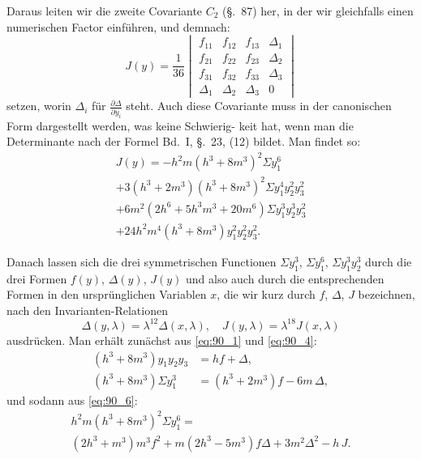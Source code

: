 \documentclass[12pt,a4paper]{article}
\theoremstyle{plain}
\theoremstyle{definition}
\theoremstyle{remark}
\begin{document}
Daraus leiten wir die zweite Covariante $C_2$ (\S.~87) her, in
der wir gleichfalls einen numerischen Factor einführen, und
demnach:
\begin{equation}\label{eq:90_5}
J(y) = \frac{1}{36}\begin{vmatrix}
f_{11} & f_{12} & f_{13} & \Delta_1 \\
f_{21} & f_{22} & f_{23} & \Delta_2 \\
f_{31} & f_{32} & f_{33} & \Delta_3 \\
\Delta_1 & \Delta_2 & \Delta_3 & 0
\end{vmatrix}
\end{equation}
setzen, worin $\Delta_i$ für $\frac{\partial \Delta}{\partial y_i}$ steht. Auch diese Covariante muss
in der canonischen Form dargestellt werden, was keine Schwierig-
keit hat, wenn man die Determinante nach der Formel Bd.~I,
\S.~23, (12) bildet. Man findet so:
\begin{multline}\label{eq:90_6}
J(y) = -h^2 m (h^3 + 8m^3)^2 \Sigma y_1^6 \\
+ 3(h^3 + 2m^3)(h^3 + 8m^3)^2 \Sigma y_1^4 y_2^2 y_3^2 \\
+ 6m^2 (2h^6 + 5h^3 m^3 + 20m^6) \Sigma y_1^3 y_2^3 y_3^2 \\
+ 24h^2 m^4 (h^3 + 8m^3) y_1^2 y_2^2 y_3^2.
\end{multline}

Danach lassen sich die drei symmetrischen Functionen
$\Sigma y_1^3$, $\Sigma y_1^6$, $\Sigma y_1^3 y_2^3$ durch die drei Formen $f(y)$, $\Delta(y)$, $J(y)$
und also auch durch die entsprechenden Formen in den
ursprünglichen Variablen $x$, die wir kurz durch $f$, $\Delta$, $J$ bezeichnen,
nach den Invarianten-Relationen
\begin{equation}\label{eq:90_inv}
\Delta(y, \lambda) = \lambda^{12} \Delta(x, \lambda), \quad J(y, \lambda) = \lambda^{18} J(x, \lambda)
\end{equation}
ausdrücken. Man erhält zunächst aus \eqref{eq:90_1} und \eqref{eq:90_4}:
\begin{align}
(h^3 + 8m^3) y_1 y_2 y_3 &= hf + \Delta, \label{eq:90_7} \\
(h^3 + 8m^3) \Sigma y_1^3 &= (h^3 + 2m^3) f - 6m\, \Delta, \label{eq:90_8}
\end{align}
und sodann aus \eqref{eq:90_6}:
\begin{multline}\label{eq:90_9}
h^2 m (h^3 + 8m^3)^2 \Sigma y_1^6 = \\
(2h^3 + m^3) m^3 f^2 + m(2h^3 - 5m^3) f\Delta + 3m^2 \Delta^2 - h\, J.
\end{multline}
\end{document}
